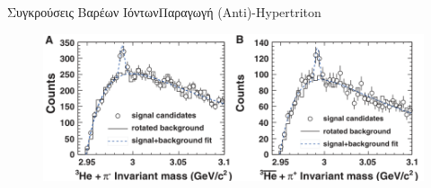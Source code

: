 \documentclass[18pt,notheorems,hyperref={pdfauthor=whatever}]{beamer}
\begin{document}
\begin{frame}{Συγκρούσεις Βαρέων Ιόντων}{Παραγωγή (Anti)-Hypertriton}
    \begin{figure}
        \centering
        \includegraphics[scale=0.8]{images/hypertriton_mass.png}
    \end{figure}
\end{frame}
\end{document}
